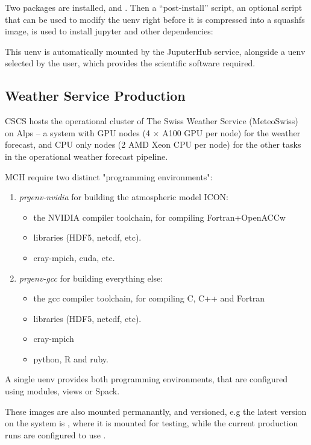 Two packages are installed,  and .
Then a ``post-install'' script, an optional script that can be used to modify the uenv right before it is compressed into a squashfs image, is used to install jupyter and other dependencies:



This uenv is automatically mounted by the JuputerHub service, alongside a uenv selected by the user, which provides the scientific software required.

\subsection{Weather Service Production}

CSCS hosts the operational cluster of The Swiss Weather Service (MeteoSwiss) on Alps -- a system with GPU nodes (4 $\times$ A100 GPU per node) for the weather forecast, and CPU only nodes (2 AMD Xeon CPU per node) for the other tasks in the operational weather forecast pipeline.

MCH require two distinct "programming environments":
\begin{enumerate}
    \item \emph{prgenv-nvidia} for building the atmospheric model ICON:
    \begin{itemize}
        \item the NVIDIA compiler toolchain, for compiling Fortran+OpenACCw
        \item libraries (HDF5, netcdf, etc).
        \item cray-mpich, cuda, etc.
    \end{itemize}
    \item \emph{prgenv-gcc} for building everything else:
    \begin{itemize}
        \item the gcc compiler toolchain, for compiling C, C++ and Fortran
        \item libraries (HDF5, netcdf, etc).
        \item cray-mpich
        \item python, R and ruby.
    \end{itemize}
\end{enumerate}
A single uenv provides both programming environments, that are configured using modules, views or Spack.

These images are also mounted permanantly, and versioned, e.g the latest version on the system is , where it is mounted for testing, while the current production runs are configured to use .
